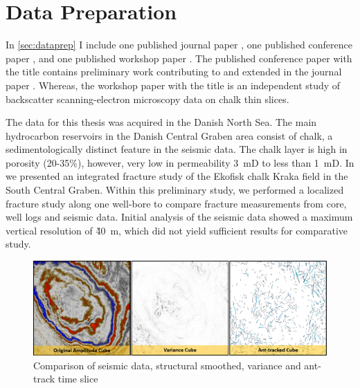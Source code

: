 \section{Data Preparation}

In \cref{sec:dataprep} I include one published journal paper \citep{aabo2018integrated}, one published conference paper \citep{aabo2017correlation}, and one published workshop paper \citep{dramsch2018gaussian}. The published conference paper with the title  contains preliminary work contributing to and extended in the journal paper . Whereas, the workshop paper with the title  is an independent study of backscatter scanning-electron microscopy data on chalk thin slices.

The data for this thesis was acquired in the Danish North Sea. The main hydrocarbon reservoirs in the Danish Central Graben area consist of chalk, a sedimentologically distinct feature in the seismic data. The chalk layer is high in porosity (20-35\%), however, very low in permeability 3~mD to less than 1~mD. In \citet{aabo2017correlation} we presented an integrated fracture study of the Ekofisk chalk Kraka field in the South Central Graben. Within this preliminary study, we performed a localized fracture study along one well-bore to compare fracture measurements from core, well logs and seismic data. Initial analysis of the seismic data showed a maximum vertical resolution of \~40~m, which did not yield sufficient results for comparative study. 

\begin{figure}[!ht]
    \centering
    \includegraphics[width=\textwidth]{figures/seismic-comparisons.png}
    \caption{Comparison of seismic data, structural smoothed, variance and ant-track time slice \citep[modified from][]{aabo2018integrated}}
    \label{fig:seismic-comparison}
\end{figure}

